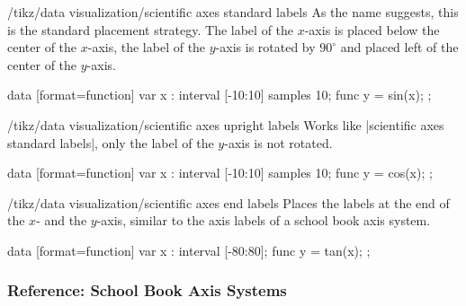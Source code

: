 \begin{key}{/tikz/data visualization/scientific axes standard labels}
  As the name suggests, this is the standard placement strategy. The
  label of the $x$-axis is placed below the center of the $x$-axis,
  the label of the $y$-axis is rotated by $90^\circ$ and placed left
  of the center of the $y$-axis.
\begin{codeexample}[width=8cm]
\tikz \datavisualization
 [scientific clean axes,
  visualize as smooth line,
  scientific axes standard labels,
  x axis={label=degree $d$,
    ticks={tick unit={}^\circ}},
  y axis={label=$\sin d$}]
data [format=function] {
  var x : interval [-10:10] samples 10;
  func y = sin(\value x);
};
\end{codeexample}
\end{key}

\begin{key}{/tikz/data visualization/scientific axes upright labels}
  Works like |scientific axes standard labels|, only the label of the
  $y$-axis is not rotated.
\begin{codeexample}[width=8cm]
\tikz \datavisualization [
  scientific clean axes,
  visualize as smooth line,
  scientific axes upright labels,
  x axis={label=degree $d$,
    ticks={tick unit={}^\circ}},
  y axis={label=$\cos d$, include value=1,
    ticks={style={
        /pgf/number format/precision=4,
        /pgf/number format/fixed zerofill}}}]
data [format=function] {
  var x : interval [-10:10] samples 10;
  func y = cos(\value x);
};
\end{codeexample}
\end{key}


\begin{key}{/tikz/data visualization/scientific axes end labels}
  Places the labels at the end of the $x$- and the $y$-axis, similar
  to the axis labels of a school book axis system.
\begin{codeexample}[width=8cm]
\tikz \datavisualization [
  scientific clean axes,
  visualize as smooth line,
  scientific axes end labels,
  x axis={label=degree $d$,
    ticks={tick unit={}^\circ}},
  y axis={label=$\tan d$}]
data [format=function] {
  var x : interval [-80:80];
  func y = tan(\value x);
};
\end{codeexample}
\end{key}



\subsubsection{Reference: School Book Axis Systems}

